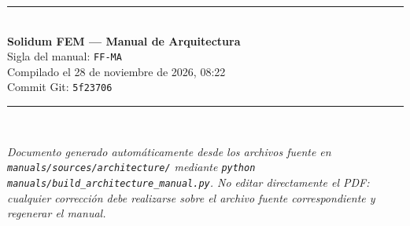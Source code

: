 \documentclass[11pt,oneside]{report}
\begin{document}
\clearpage
\thispagestyle{empty}
\vspace*{\fill}
\begin{center}
\rule{0.4\textwidth}{0.4pt}\\[1em]
{\bfseries\color{yamlkey} Solidum FEM --- Manual de Arquitectura}\\[0.5em]
Sigla del manual: \texttt{FF-MA}\\[0.5em]
Compilado el 28 de noviembre de 2026, 08:22\\[0.5em]
Commit Git: \texttt{5f23706}\\[1em]
\rule{0.4\textwidth}{0.4pt}\\[2em]
\parbox{0.75\textwidth}{\small\itshape\centering
Documento generado automáticamente desde los archivos fuente en \texttt{manuals/sources/architecture/} mediante \texttt{python manuals/build\_architecture\_manual.py}. No editar directamente el PDF: cualquier corrección debe realizarse sobre el archivo fuente correspondiente y regenerar el manual.}
\end{center}
\vspace*{\fill}
\end{document}
